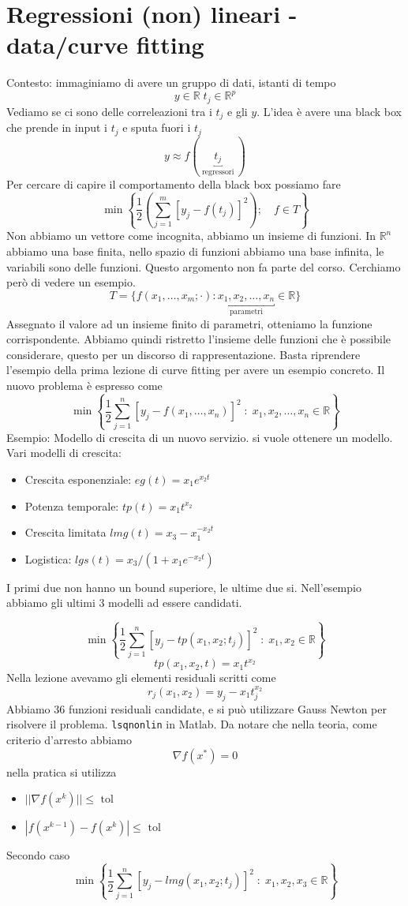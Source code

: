 \section{Regressioni (non) lineari - data/curve fitting}
Contesto: immaginiamo di avere un gruppo di dati, istanti di
tempo 
$$ y \in \mathbb{R}\; t_j \in \mathbb{R}^{p} $$
Vediamo se ci sono delle correleazioni tra i $t_j$
e gli $y$.
L'idea è avere una black box che prende in input
i $t_j$ e sputa fuori i $t_j$
$$ y \approx f(\underbracket{t_j}_{\text{ regressori }})$$
Per cercare di capire il comportamento della black box
possiamo fare
$$
\min\left\{ \frac{1}{2}
\left(\displaystyle \sum_{j=1}^{m} [y_j - f(t_j)]^{2} \right)
; \quad f \in T
\right\}
$$
Non abbiamo un vettore come incognita, abbiamo un insieme di funzioni.
In $\mathbb{R}^{n}$ abbiamo una base finita, nello spazio
di funzioni abbiamo una base infinita, le variabili sono
delle funzioni. Questo argomento non fa parte del corso.
Cerchiamo però di vedere un esempio.
$$ T = \{ f(x_1,\ldots, x_m; \cdot) :
\underbracket{x_1, x_2, \ldots, x_n}_{\text{parametri}} \in \mathbb{R}  \}$$
Assegnato il valore ad un insieme finito di parametri,
otteniamo la funzione corrispondente.
Abbiamo quindi ristretto l'insieme delle funzioni che è possibile
considerare, questo per un discorso di rappresentazione.
Basta riprendere l'esempio della prima lezione
di curve fitting per avere un esempio concreto.
Il nuovo problema è espresso come
$$ \min \left\{ \frac{1}{2} 
\displaystyle \sum_{j=1}^{n}[y_j - f(x_1,\ldots, x_n)]^{2}\; : \;
x_1, x_2, \ldots, x_n \in \mathbb{R} \right\}
$$
Esempio: Modello di crescita di un nuovo servizio.
si vuole ottenere un modello.
Vari modelli di crescita:
\begin{itemize}
\item Crescita esponenziale: $eg(t)  = x_1 e^{x_2 t}$
\item Potenza temporale: $tp(t)= x_1t^{x_2}$
 \item Crescita limitata $lmg(t) = x_3 - x_1^{-x_2 t}$
\item Logistica: $lgs(t) = x_3 / (1 + x_1 e^{-x_2 t})$
\end{itemize}
I primi due non hanno un bound superiore, le ultime due si.
Nell'esempio abbiamo gli ultimi 3 modelli ad essere
candidati.

$$
 \min \left\{ \frac{1}{2} 
\displaystyle \sum_{j=1}^{n}[y_j - tp(x_1,x_2;t_j)]^{2}\; : \;
x_1, x_2 \in \mathbb{R} \right\}
$$
$$ tp(x_1,x_2,t) = x_1 t^{x_2}$$
Nella lezione avevamo gli elementi residuali scritti come
$$ r_j(x_1, x_2) = y_j - x_1 t_j^{x_2}$$
Abbiamo 36 funzioni residuali candidate, e si può
utilizzare Gauss Newton per risolvere il problema.
\texttt{lsqnonlin} in Matlab.
Da notare che nella teoria, come criterio d'arresto
abbiamo
$$\nabla f(x^{*})=0$$
nella pratica si utilizza
\begin{itemize}
\item $ || \nabla f(x^{k})|| \leq \text{ tol } $
 \item $ |f(x^{k-1}) - f(x^{k})| \leq \text{ tol } $
\end{itemize}
Secondo caso
$$
 \min \left\{ \frac{1}{2} 
\displaystyle \sum_{j=1}^{n}[y_j - lmg(x_1,x_2;t_j)]^{2}\; : \;
x_1, x_2 , x_3 \in \mathbb{R} \right\}
$$

